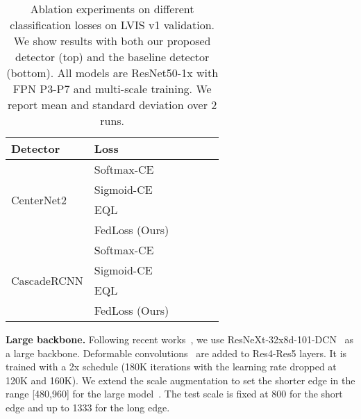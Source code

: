 \documentclass{article}
\renewcommand{\paragraph}[1]{\noindent\textbf{#1}}
\begin{document}
\begin{table*}[!t]
\centering
\begin{tabular}{@{}l@{\ \ \ }l@{\ \ }c@{\ \ \ \ }c@{\ \ \ \ }c@{\ \ \ \ }c@{}}
\toprule
Detector & Loss &  &  &  &  \\
\midrule
\multirow{4}{7em}{CenterNet2}
& Softmax-CE &  \scriptsize  &  \scriptsize  &  \scriptsize  &  \scriptsize   \\
& Sigmoid-CE &  \scriptsize  &  \scriptsize  &  \scriptsize  &  \scriptsize  \\
& EQL~\cite{tan2020eql} &  \scriptsize  &  \scriptsize  &  \scriptsize  &  \scriptsize  \\
& FedLoss (Ours) &  \scriptsize  &  \scriptsize  &  \scriptsize  &  \scriptsize \\
\midrule
\multirow{4}{7em}{CascadeRCNN}
& Softmax-CE  &  \scriptsize  &  \scriptsize  &  \scriptsize  &  \scriptsize   \\
& Sigmoid-CE &  \scriptsize  &  \scriptsize  &  \scriptsize  &  \scriptsize  \\
& EQL~\cite{tan2020eql} &  \scriptsize  &  \scriptsize  &  \scriptsize  &  \scriptsize  \\
& FedLoss (Ours) &  \scriptsize  &  \scriptsize  &  \scriptsize  &  \scriptsize  \\
\bottomrule
\end{tabular}
\normalsize
\caption{Ablation experiments on different classification losses on LVIS v1 validation. We show results with both our proposed detector (top) and the baseline detector (bottom). All models are ResNet50-1x with FPN P3-P7 and multi-scale training. We report mean and standard deviation over 2 runs.}
\label{table:fedloss}
\vspace{-3mm}
\end{table*}

\paragraph{Large backbone.}
Following recent works~\cite{tian2019fcos,zhu2020autoassign,zhang2020bridging},
we use ResNeXt-32x8d-101-DCN~\cite{xie2017aggregated} as a large backbone.
Deformable convolutions~\cite{zhu2019deformable} are added to Res4-Res5 layers.
It is trained with a 2x schedule (180K iterations with the learning rate dropped at 120K and 160K). 
We extend the scale augmentation to set the shorter edge in the range [480,960] for the large model~\cite{zhang2019freeanchor,zhu2020autoassign,chen2020reppointsv2}.
The test scale is fixed at 800 for the short edge and up to 1333 for the long edge.
\end{document}
